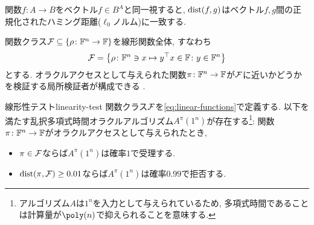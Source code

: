関数$f\colon A\to B$をベクトル$f\in B^A$と同一視すると, $\mathrm{dist}(f,g)$はベクトル$f,g$間の正規化されたハミング距離($\ell_0$ノルム)に一致する.

関数クラス$\mathcal{F}\subseteq \qty{ \rho\colon \mathbb{F}^n\to\mathbb{F}}$を線形関数全体, すなわち
\begin{align}
  \mathcal{F} = \qty{ \rho\colon \mathbb{F}^n\ni x\mapsto y^\top x\in \mathbb{F}\colon y\in \mathbb{F}^n } \label{eq:linear-functions}
\end{align}
とする.
オラクルアクセスとして与えられた関数$\pi\colon \mathbb{F}^n\to\mathbb{F}$が$\mathcal{F}$に近いかどうかを検証する局所検証者が構成できる \citet{BLR93}.

\begin{theorem}{線形性テスト}{linearity-test}
  関数クラス$\mathcal{F}$を\cref{eq:linear-functions}で定義する.
  以下を満たす乱択多項式時間オラクルアルゴリズム$A^\pi(1^n)$が存在する\footnote{アルゴリズム$A$は$1^n$を入力として与えられているため, 多項式時間であることは計算量が$\poly(n)$で抑えられることを意味する.}:
  関数$\pi\colon \mathbb{F}^n\to\mathbb{F}$がオラクルアクセスとして与えられたとき,
  \begin{itemize}
    \item $\pi\in \mathcal{F}$ならば$A^\pi(1^n)$は確率$1$で受理する.
    \item $\mathrm{dist}(\pi,\mathcal{F})\ge 0.01$ならば$A^\pi(1^n)$は確率$0.99$で拒否する.
  \end{itemize}
\end{theorem}
